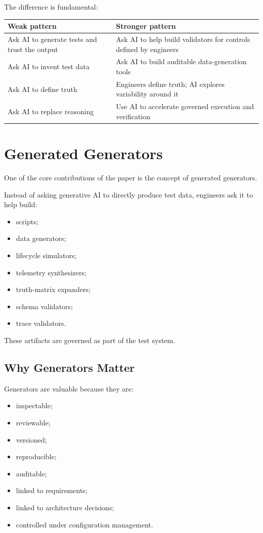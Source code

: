 \documentclass[11pt,a4paper]{article}
\begin{document}
The difference is fundamental:

\begin{center}
\begin{tabular}{p{5.6cm}p{7.6cm}}
\toprule
\textbf{Weak pattern} & \textbf{Stronger pattern} \\
\midrule
Ask AI to generate tests and trust the output & Ask AI to help build validators for controls defined by engineers \\
Ask AI to invent test data & Ask AI to build auditable data-generation tools \\
Ask AI to define truth & Engineers define truth; AI explores variability around it \\
Ask AI to replace reasoning & Use AI to accelerate governed execution and verification \\
\bottomrule
\end{tabular}
\end{center}

\section{Generated Generators}

One of the core contributions of the paper is the concept of generated generators.

Instead of asking generative AI to directly produce test data, engineers ask it to help build:
\begin{itemize}
\item scripts;
\item data generators;
\item lifecycle simulators;
\item telemetry synthesizers;
\item truth-matrix expanders;
\item schema validators;
\item trace validators.
\end{itemize}

These artifacts are governed as part of the test system.

\subsection{Why Generators Matter}

Generators are valuable because they are:
\begin{itemize}
\item inspectable;
\item reviewable;
\item versioned;
\item reproducible;
\item auditable;
\item linked to requirements;
\item linked to architecture decisions;
\item controlled under configuration management.
\end{itemize}
\end{document}
